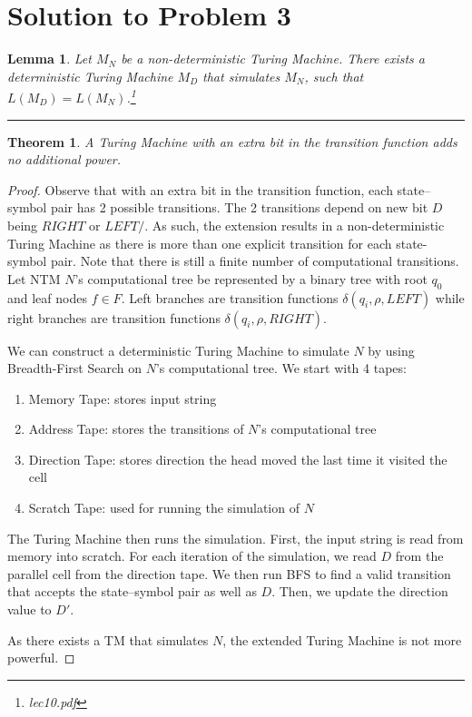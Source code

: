 \documentclass[11pt]{report}
\newcounter{problem}
\theoremstyle{definition}
\theoremstyle{plain}
\newtheorem{lemma}{Lemma}[problem]
\theoremstyle{plain}
\newtheorem{theorem*}{Theorem}
\begin{document}
\section*{Solution to Problem 3}

\begin{lemma}
Let $M_{N}$ be a non-deterministic Turing Machine. 
There exists a deterministic Turing Machine $M_{D}$ that simulates $M_{N}$,
such that $L(M_{D})=L(M_{N})$.\footnote{lec10.pdf}
\end{lemma}

\hrule

\begin{theorem*}
A Turing Machine with an extra bit in the transition function adds no additional power.
\end{theorem*}

\begin{proof}
Observe that with an extra bit in the transition function, each state--symbol pair has 2 possible transitions.
The 2 transitions depend on new bit $D$ being $RIGHT$ or $LEFT/$\textvisiblespace. 
As such, the extension results in a non-deterministic Turing Machine 
as there is more than one explicit transition for each state-symbol pair.
Note that there is still a finite number of computational transitions.%
Let NTM $N$'s computational tree be represented by a binary tree with root $q_{0}$ and leaf nodes $f \in F$.
Left branches are transition functions $\delta(q_{i},\rho,LEFT)$ 
while right branches are transition functions $\delta(q_{i},\rho,RIGHT)$.\newline

\noindent We can construct a deterministic Turing Machine to simulate $N$ by using Breadth-First Search
on $N$'s computational tree. We start with 4 tapes:
\begin{enumerate}
\item Memory Tape: stores input string
\item Address Tape: stores the transitions of $N$'s computational tree
\item Direction Tape: stores direction the head moved the last time it visited the cell
\item Scratch Tape: used for running the simulation of $N$
\end{enumerate}

\noindent The Turing Machine then runs the simulation. 
First, the input string is read from memory into scratch.
For each iteration of the simulation, we read $D$ from the parallel cell from the direction tape.
We then run BFS to find a valid transition that accepts the state--symbol pair as well as $D$.
Then, we update the direction value to $D'$. \newline

\noindent As there exists a TM that simulates $N$, the extended Turing Machine is not more powerful.
\end{proof}
\end{document}
